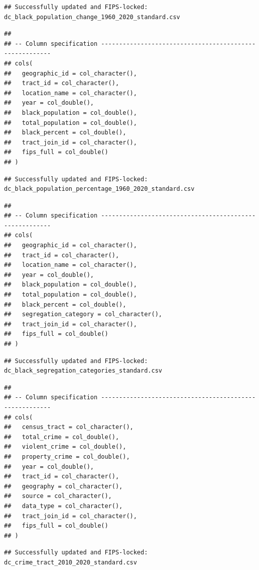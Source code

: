 \documentclass[
]{article}
\begin{document}
\begin{verbatim}
## Successfully updated and FIPS-locked: dc_black_population_change_1960_2020_standard.csv
\end{verbatim}

\begin{verbatim}
## 
## -- Column specification --------------------------------------------------------
## cols(
##   geographic_id = col_character(),
##   tract_id = col_character(),
##   location_name = col_character(),
##   year = col_double(),
##   black_population = col_double(),
##   total_population = col_double(),
##   black_percent = col_double(),
##   tract_join_id = col_character(),
##   fips_full = col_double()
## )
\end{verbatim}

\begin{verbatim}
## Successfully updated and FIPS-locked: dc_black_population_percentage_1960_2020_standard.csv
\end{verbatim}

\begin{verbatim}
## 
## -- Column specification --------------------------------------------------------
## cols(
##   geographic_id = col_character(),
##   tract_id = col_character(),
##   location_name = col_character(),
##   year = col_double(),
##   black_population = col_double(),
##   total_population = col_double(),
##   black_percent = col_double(),
##   segregation_category = col_character(),
##   tract_join_id = col_character(),
##   fips_full = col_double()
## )
\end{verbatim}

\begin{verbatim}
## Successfully updated and FIPS-locked: dc_black_segregation_categories_standard.csv
\end{verbatim}

\begin{verbatim}
## 
## -- Column specification --------------------------------------------------------
## cols(
##   census_tract = col_character(),
##   total_crime = col_double(),
##   violent_crime = col_double(),
##   property_crime = col_double(),
##   year = col_double(),
##   tract_id = col_character(),
##   geography = col_character(),
##   source = col_character(),
##   data_type = col_character(),
##   tract_join_id = col_character(),
##   fips_full = col_double()
## )
\end{verbatim}

\begin{verbatim}
## Successfully updated and FIPS-locked: dc_crime_tract_2010_2020_standard.csv
\end{verbatim}
\end{document}
